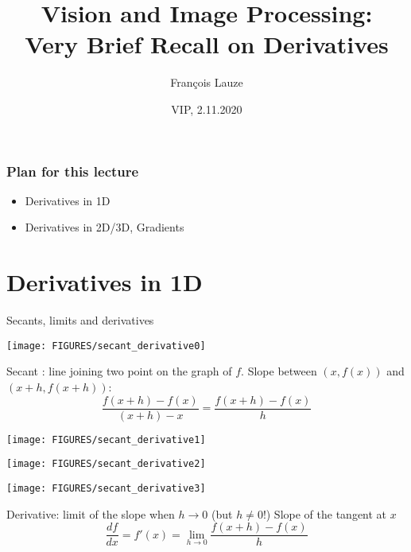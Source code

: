 \documentclass[8pt,dvipsnames]{beamer}
\title{Vision and Image Processing:\\ Very Brief Recall on Derivatives}
\author[F.~Lauze] %
{Fran{\c c}ois Lauze}
\institute[DIKU] %
{
  Department of Computer Science\\
  University of Copenhagen
}
\date[2020-21 B2]{VIP, 2.11.2020}
\begin{document}
\maketitle







 
  

\begin{frame}
  \frametitle{Plan for this lecture}
  \begin{itemize}
  \item Derivatives in 1D
  \item Derivatives in 2D/3D, Gradients
  \end{itemize}
\end{frame}


\section{Derivatives in 1D}

\begin{frame}{Secants, limits and derivatives}
  \begin{overprint}   
        \begin{center}
          \texttt{[image: FIGURES/secant\_derivative0]}
        \end{center}
        Secant : line joining two point on the graph of $f$. Slope between $(x, f(x))$ and $(x+h, f(x+h))$:
        $$
          \frac{f(x+h)-f(x)}{(x+h)-x} = \frac{f(x+h)-f(x)}{h}
        $$
        \begin{center}
          \texttt{[image: FIGURES/secant\_derivative1]}
        \end{center}
        \begin{center}
          \texttt{[image: FIGURES/secant\_derivative2]}
        \end{center}
        \begin{center}
          \texttt{[image: FIGURES/secant\_derivative3]}
        \end{center}  
        Derivative: limit of the slope when $h\to 0$ (but $h\not = 0$!) Slope of the tangent at $x$
        $$
          \frac{df}{dx} = f'(x) = \lim_{h\to 0} \frac{f(x+h)-f(x)}{h}
        $$
        \begin{center}
        \end{center}
  \end{overprint}
\end{frame}
\end{document}
